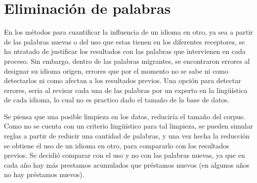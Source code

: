 \chapter{Eliminación de palabras}

En los métodos para cuantificar la influencia de un idioma en otro, ya sea a
partir de las palabras nuevas o del uso que estas tienen en los diferentes
receptores, se ha ntratado de justificar los resultados con las palabras que
intervienen en cada proceso. Sin embargo, dentro de las palabras migrantes, se encontraron errores al designar su idioma origen, errores que por el momento no se sabe ni como detectarlos ni como afectan a los resultados previos.  Una opción para detectar errores, seria al revisar cada una de las palabras por un experto en la lingüística de cada idioma, lo cual no es practico dado el tamaño de la base de datos.

Se piensa que una posible limpieza en los datos, reduciría el tamaño del corpus. Como no se cuenta con un criterio lingüístico para tal limpieza, se pueden simular reglas a partir de reducir una cantidad de palabras, y una vez hecha la reducción se obtiene el uso de un idioma en otro, para compararlo con los resultados previos. Se decidió comparar con el uso y no con las palabras nuevas, ya que en cada año hay más prestamos acumulados que préstamos nuevos (en algunos años no hay préstamos nuevos).

 


